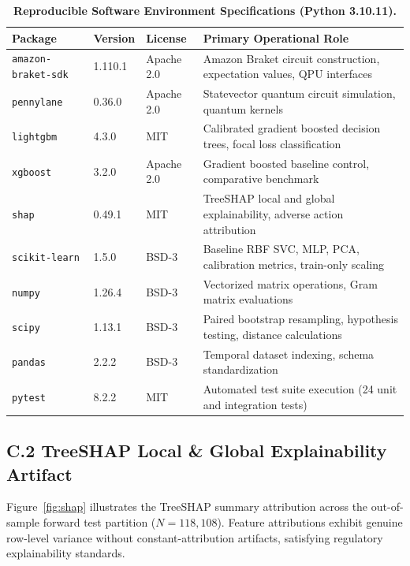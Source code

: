 \documentclass[10pt,a4paper]{article}
\begin{document}
\vspace{-2pt}
\begin{table}[h!]
\centering
\renewcommand{\arraystretch}{0.68}
\caption{\textbf{Reproducible Software Environment Specifications (Python 3.10.11).}}
\label{tab:env}
\vspace{1pt}
\begin{tabularx}{\linewidth}{@{}lllX@{}}
\toprule
\textbf{Package} & \textbf{Version} & \textbf{License} & \textbf{Primary Operational Role} \\
\midrule
\texttt{amazon-braket-sdk} & 1.110.1 & Apache 2.0 & Amazon Braket circuit construction, expectation values, QPU interfaces \\
\texttt{pennylane} & 0.36.0 & Apache 2.0 & Statevector quantum circuit simulation, quantum kernels \\
\texttt{lightgbm} & 4.3.0 & MIT & Calibrated gradient boosted decision trees, focal loss classification \\
\texttt{xgboost} & 3.2.0 & Apache 2.0 & Gradient boosted baseline control, comparative benchmark \\
\texttt{shap} & 0.49.1 & MIT & TreeSHAP local and global explainability, adverse action attribution \\
\texttt{scikit-learn} & 1.5.0 & BSD-3 & Baseline RBF SVC, MLP, PCA, calibration metrics, train-only scaling \\
\texttt{numpy} & 1.26.4 & BSD-3 & Vectorized matrix operations, Gram matrix evaluations \\
\texttt{scipy} & 1.13.1 & BSD-3 & Paired bootstrap resampling, hypothesis testing, distance calculations \\
\texttt{pandas} & 2.2.2 & BSD-3 & Temporal dataset indexing, schema standardization \\
\texttt{pytest} & 8.2.2 & MIT & Automated test suite execution (24 unit and integration tests) \\
\bottomrule
\end{tabularx}
\end{table}
\vspace{-8pt}

\subsection*{C.2 TreeSHAP Local \& Global Explainability Artifact}
Figure~\ref{fig:shap} illustrates the TreeSHAP summary attribution across the out-of-sample forward test partition ($N=118,108$). Feature attributions exhibit genuine row-level variance without constant-attribution artifacts, satisfying regulatory explainability standards.
\end{document}
